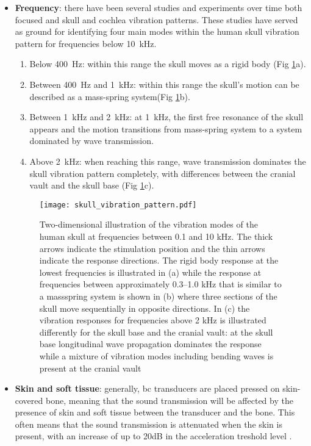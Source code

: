 \begin{itemize}
\item \textbf{Frequency}: there have been several studies and experiments over time both focused and skull and cochlea vibration patterns. These studies have served as ground for identifying four main modes within the human skull vibration pattern for frequencies below \SI{10}{\kilo\hertz}.
\begin{enumerate}
\item Below \SI{400}{\hertz}: within this range the skull moves as a rigid body (Fig \ref{fig:skull_vibration_pattern}a).\citep{stenfelt_2005b}
\item Between \SI{400}{\hertz} and \SI{1}{\kilo\hertz}: within this range the skull's motion can be described as a mass-spring system(Fig \ref{fig:skull_vibration_pattern}b).
\item Between \SI{1}{\kilo\hertz} and \SI{2}{\kilo\hertz}: at \SI{1}{\kilo\hertz}, the first free resonance of the skull appears \citep{hakansson_1994} and the motion transitions from mass-spring system to a system dominated by wave transmission.
\item Above \SI{2}{\kilo\hertz}: when reaching this range, wave transmission dominates the skull vibration pattern completely, with differences between the cranial vault and the skull base (Fig \ref{fig:skull_vibration_pattern}c).
\end{enumerate}
\begin{figure}[H]
	\centering
		\texttt{[image: skull\_vibration\_pattern.pdf]}
		\caption{Two-dimensional illustration of the vibration modes of the human skull at frequencies between 0.1 and 10 kHz. The thick arrows indicate the stimulation position and the thin arrows indicate the response directions. The rigid body response at the lowest frequencies is illustrated in (a) while the response at frequencies between approximately 0.3–1.0 kHz that is similar to a massspring system is shown in (b) where three sections of the skull move sequentially in opposite directions. In (c) the vibration responses for frequencies above 2 kHz is illustrated differently for the skull base and the cranial vault: at the skull base longitudinal wave propagation dominates the response while a mixture of vibration modes including bending waves is present at the cranial vault \citep{puria_2013}}
		\label{fig:skull_vibration_pattern}
\end{figure}
\item \textbf{Skin and soft tissue}: generally, \gls{bc} transducers are placed pressed on skin-covered bone, meaning that the sound transmission will be affected by the presence of skin and soft tissue between the transducer and the bone. This often means that the sound transmission is attenuated when the skin is present, with an increase of up to 20dB in the acceleration treshold level \citep{hakansson_185}.

\end{itemize}
